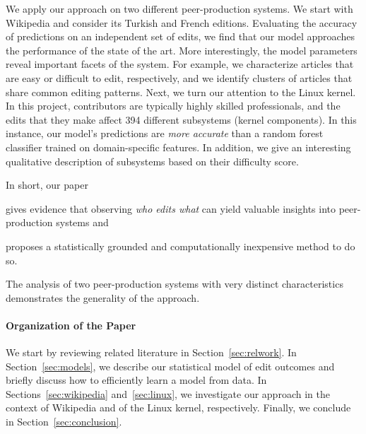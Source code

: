 We apply our approach on two different peer-production systems.
We start with Wikipedia and consider its Turkish and French editions.
Evaluating the accuracy of predictions on an independent set of edits, we find that our model approaches the performance of the state of the art.
More interestingly, the model parameters reveal important facets of the system.
For example, we characterize articles that are easy or difficult to edit, respectively, and we identify clusters of articles that share common editing patterns.
Next, we turn our attention to the Linux kernel.
In this project, contributors are typically highly skilled professionals, and the edits that they make affect \num{394} different subsystems (kernel components).
In this instance, our model's predictions are \emph{more accurate} than a random forest classifier trained on domain-specific features.
In addition, we give an interesting qualitative description of subsystems based on their difficulty score.

In short, our paper
\begin{enuminline}
\item gives evidence that observing \emph{who edits what} can yield valuable insights into peer-production systems and
\item proposes a statistically grounded and computationally inexpensive method to do so.
\end{enuminline}
The analysis of two peer-production systems with very distinct characteristics demonstrates the generality of the approach.

\paragraph{Organization of the Paper}
We start by reviewing related literature in Section~\ref{sec:relwork}.
In Section~\ref{sec:models}, we describe our statistical model of edit outcomes and briefly discuss how to efficiently learn a model from data.
In Sections~\ref{sec:wikipedia} and~\ref{sec:linux}, we investigate our approach in the context of Wikipedia and of the Linux kernel, respectively.
Finally, we conclude in Section~\ref{sec:conclusion}.

